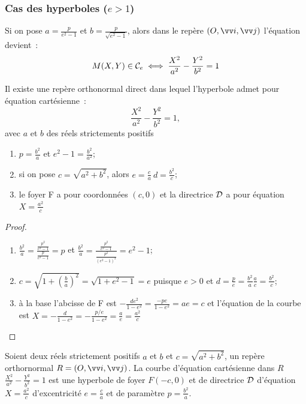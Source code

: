 \subsubsection{Cas des hyperboles ($e>1$)}
Si on pose $a=\frac{p}{e^2-1}$ et $b=\frac{p}{\sqrt{e^2-1}}$, alors dans le repère $\rond$ l'équation devient~:
\begin{equation}
  M(X,Y) \in \mathcal{C}_e \iff \frac{X^2}{a^2}-\frac{Y^2}{b^2}=1
\end{equation}
\begin{theo}
  Il existe une repère orthonormal direct dans lequel l'hyperbole admet pour équation cartésienne~:
  \begin{equation}
    \frac{X^2}{a^2}-\frac{Y^2}{b^2}=1,
  \end{equation}
avec $a$ et $b$ des réels strictements positifs
\end{theo}
\begin{prop}
  \begin{enumerate}
  \item $p=\frac{b^2}{a}$ et $e^2-1=\frac{b^2}{a^2}$;
  \item si on pose $c=\sqrt{a^2+b^2}$, alors $e=\frac{c}{a} \ d=\frac{b^2}{c}$;
  \item le foyer F a pour coordonnées $(c,0)$ et la directrice $\mathcal{D}$ a pour équation $X=\frac{a^2}{c}$
  \end{enumerate}
\end{prop}
\begin{proof}
  \begin{enumerate}
  \item $\frac{b^2}{a}=\frac{\frac{p^2}{e^2-1}}{\frac{p}{e^2-1}}=p$ et $\frac{b^2}{a}=\frac{\frac{p^2}{e^2-1}}{\frac{p^2}{(e^2-1)^2}}=e^2-1$;
  \item $c=\sqrt{1+\left(\frac{b}{a}\right)^2}=\sqrt{1+e^2-1}=e$ puisque $e>0$ et $d=\frac{p}{e}=\frac{b^2}{a} \frac{a}{c}=\frac{b^2}{c}$;
  \item à la base l'abcisse de F est $-\frac{de^2}{1-e^2}=\frac{-pe}{1-e^2}=ae=c$ et l'équation de la courbe est $X=-\frac{d}{1-e^2}=-\frac{p/e}{1-e^2}=\frac{a}{e}=\frac{a^2}{c}$
  \end{enumerate}
\end{proof}
\begin{theo}
  Soient deux réels strictement positifs $a$ et $b$ et $c=\sqrt{a^2+b^2}$, un repère orthornormal $R=\rond$. La courbe d'équation cartésienne dans $R$ $\frac{X^2}{a^2}-\frac{Y^2}{b^2}=1$ est une hyperbole de foyer $F(-c,0)$ et de directrice $\mathcal{D}$ d'équation $X=\frac{a^2}{c}$ d'excentricité $e=\frac{c}{a}$ et de paramètre $p=\frac{b^2}{a}$.
\end{theo}
